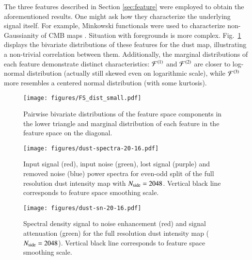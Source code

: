 \documentclass{aa}
\newcommand{\nside}{\ensuremath N_{\text{side}}}
\begin{document}
The three features described in Section \ref{sec:feature} were employed to obtain the aforementioned results. One might ask how they characterize the underlying signal itself. For example, Minkowski functionals were used to characterize non-Gaussianity of CMB maps \citep{1998MNRAS.297..355S}. Situation with foregrounds is more complex. Fig.~\ref{fig:distributions} displays the bivariate distributions of these features for the dust map, illustrating a non-trivial correlation between them. Additionally, the marginal distributions of each feature demonstrate distinct characteristics: ${\cal F}^{(1)}$ and ${\cal F}^{(2)}$ are closer to log-normal distribution (actually still skewed even on logarithmic scale), while ${\cal F}^{(3)}$ more resembles a centered normal distribution (with some kurtosis).

\begin{figure}
    \centering
    \texttt{[image: figures/FS\_dist\_small.pdf]}
    \caption{Pairwise bivariate distributions of the feature space components in the lower triangle and marginal distribution of each feature in the feature space on the diagonal.}
    \label{fig:distributions}
\end{figure}

\begin{figure}
    \centering
    \texttt{[image: figures/dust-spectra-20-16.pdf]}
    \caption{Input signal (red), input noise (green), lost signal (purple) and removed noise (blue) power spectra for even-odd split of the full resolution dust intensity map with $\nside=2048$. Vertical black line corresponds to feature space smoothing scale.}
    \label{fig:dust:spectra}
\medskip
    \centering
    \texttt{[image: figures/dust-sn-20-16.pdf]}
    \caption{Spectral density signal to noise enhancement (red) and signal attenuation (green) for the full resolution dust intensity map ($\nside=2048$). Vertical black line corresponds to feature space smoothing scale.}
    \label{fig:dust:sn}
\end{figure}
\end{document}
